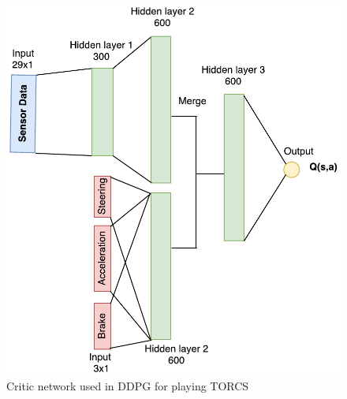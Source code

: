 \begin{figure}[H]
	\centering
	\includegraphics[width=1\textwidth]{Figures/Architecture/DDPG/DDPG_Critic_network.pdf}
	\caption{Critic network used in DDPG for playing TORCS }
	\label{fig:DDPG_Critic_network}
\end{figure}  


